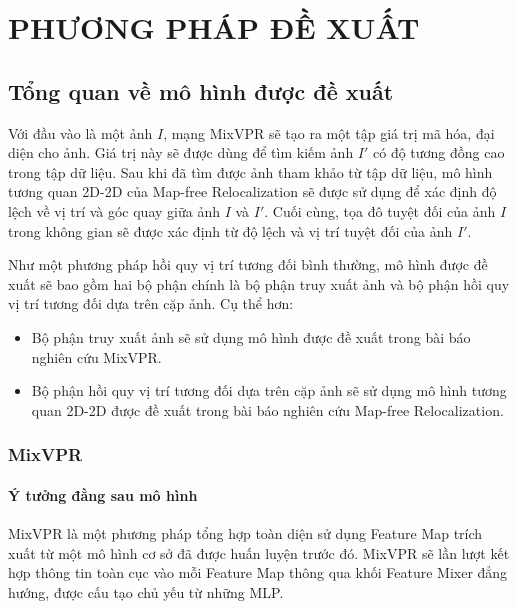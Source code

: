 \chapter{PHƯƠNG PHÁP ĐỀ XUẤT}

\section{Tổng quan về mô hình được đề xuất}
Với đầu vào là một ảnh $I$, mạng MixVPR sẽ tạo ra một tập giá trị mã hóa, đại diện cho ảnh. Giá trị này sẽ được dùng để tìm kiếm ảnh $I'$ có độ tương đồng cao trong tập dữ liệu. Sau khi đã tìm được ảnh tham khảo từ tập dữ liệu, mô hình tương quan 2D-2D của Map-free Relocalization sẽ được sử dụng để xác định độ lệch về vị trí và góc quay giữa ảnh $I$ và $I'$. Cuối cùng, tọa đô tuyệt đối của ảnh $I$ trong không gian sẽ được xác định từ độ lệch và vị trí tuyệt đối của ảnh $I'$.

Như một phương pháp hồi quy vị trí tương đối bình thường, mô hình được đề xuất sẽ bao gồm hai bộ phận chính là bộ phận truy xuất ảnh và bộ phận hồi quy vị trí tương đối dựa trên cặp ảnh. Cụ thể hơn:
\begin{itemize}
    \item Bộ phận truy xuất ảnh sẽ sử dụng mô hình được đề xuất trong bài báo nghiên cứu MixVPR.
    \item Bộ phận hồi quy vị trí tương đối dựa trên cặp ảnh sẽ sử dụng mô hình tương quan 2D-2D được đề xuất trong bài báo nghiên cứu Map-free Relocalization.
\end{itemize}

\subsection{MixVPR \cite{alibey2023mixvpr}}
\subsubsection*{Ý tưởng đằng sau mô hình}
MixVPR là một phương pháp tổng hợp toàn diện sử dụng Feature Map trích xuất từ một mô hình cơ sở đã được huấn luyện trước đó. MixVPR sẽ lần lượt kết hợp thông tin toàn cục vào mỗi Feature Map thông qua khối Feature Mixer đẳng hướng, được cấu tạo chủ yếu từ những MLP. 

